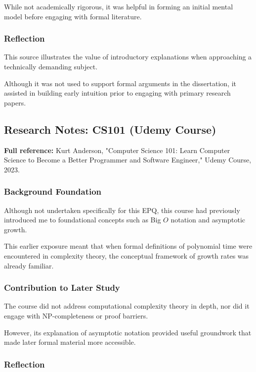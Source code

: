 \documentclass[12pt]{article}
\begin{document}
While not academically rigorous, it was helpful in forming an initial mental model before engaging with formal literature.

\subsubsection*{Reflection}

This source illustrates the value of introductory explanations when approaching a technically demanding subject.

Although it was not used to support formal arguments in the dissertation, it assisted in building early intuition prior to engaging with primary research papers.

\subsection{Research Notes: CS101 (Udemy Course)}

\textbf{Full reference:} Kurt Anderson,
"Computer Science 101: Learn Computer Science to Become a Better Programmer and Software Engineer,"
Udemy Course, 2023.

\subsubsection*{Background Foundation}

Although not undertaken specifically for this EPQ, this course had previously introduced me to foundational concepts such as Big $O$ notation and asymptotic growth.

This earlier exposure meant that when formal definitions of polynomial time were encountered in complexity theory, the conceptual framework of growth rates was already familiar.

\subsubsection*{Contribution to Later Study}

The course did not address computational complexity theory in depth, nor did it engage with NP-completeness or proof barriers.

However, its explanation of asymptotic notation provided useful groundwork that made later formal material more accessible.

\subsubsection*{Reflection}
\end{document}
